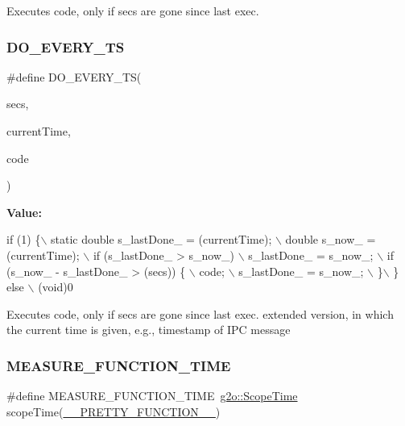Executes code, only if secs are gone since last exec. 

\mbox{\label{group__utils_ga9b9f34c01b03b47644c2762bf256be32}} 
\subsubsection{\texorpdfstring{D\+O\+\_\+\+E\+V\+E\+R\+Y\+\_\+\+TS}{DO\_EVERY\_TS}}
{\footnotesize\ttfamily \#define D\+O\+\_\+\+E\+V\+E\+R\+Y\+\_\+\+TS(\begin{DoxyParamCaption}\item[{}]{secs,  }\item[{}]{current\+Time,  }\item[{}]{code }\end{DoxyParamCaption})}

{\bfseries Value\+:}
\begin{DoxyCode}
\textcolor{keywordflow}{if} (1) \{\(\backslash\)
  static \textcolor{keywordtype}{double} s\_lastDone\_ = (currentTime); \(\backslash\)
  double s\_now\_ = (currentTime); \(\backslash\)
  if (s\_lastDone\_ > s\_now\_) \(\backslash\)
    s\_lastDone\_ = s\_now\_; \(\backslash\)
  if (s\_now\_ - s\_lastDone\_ > (secs)) \{ \(\backslash\)
    code; \(\backslash\)
    s\_lastDone\_ = s\_now\_; \(\backslash\)
  \}\(\backslash\)
\} \textcolor{keywordflow}{else} \(\backslash\)
  (void)0
\end{DoxyCode}
Executes code, only if secs are gone since last exec. extended version, in which the current time is given, e.\+g., timestamp of I\+PC message \mbox{\label{group__utils_gae79acf8eb730f80c029d60e19332b4b9}} 
\subsubsection{\texorpdfstring{M\+E\+A\+S\+U\+R\+E\+\_\+\+F\+U\+N\+C\+T\+I\+O\+N\+\_\+\+T\+I\+ME}{MEASURE\_FUNCTION\_TIME}}
{\footnotesize\ttfamily \#define M\+E\+A\+S\+U\+R\+E\+\_\+\+F\+U\+N\+C\+T\+I\+O\+N\+\_\+\+T\+I\+ME~\mbox{\hyperlink{classg2o_1_1_scope_time}{g2o\+::\+Scope\+Time}} scope\+Time(\mbox{\hyperlink{macros_8h_a9c15fe1e91b07ea3280f5239f9841b67}{\+\_\+\+\_\+\+P\+R\+E\+T\+T\+Y\+\_\+\+F\+U\+N\+C\+T\+I\+O\+N\+\_\+\+\_\+}})}

